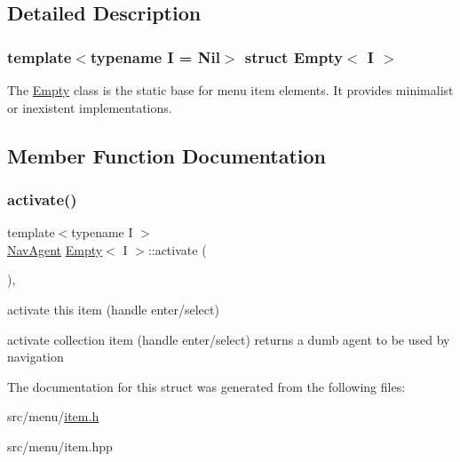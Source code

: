 \subsection{Detailed Description}
\subsubsection*{template$<$typename I = Nil$>$\newline
struct Empty$<$ I $>$}

The \hyperlink{structEmpty}{Empty} class is the static base for menu item elements. It provides minimalist or inexistent implementations. 

\subsection{Member Function Documentation}
\mbox{\label{structEmpty_ade3cccf531dad6fe907c3a9764204e1c}} 
\subsubsection{\texorpdfstring{activate()}{activate()}}
{\footnotesize\ttfamily template$<$typename I $>$ \\
\hyperlink{structNavAgent}{Nav\+Agent} \hyperlink{structEmpty}{Empty}$<$ I $>$\+::activate (\begin{DoxyParamCaption}{ }\end{DoxyParamCaption})\hspace{0.3cm}{\ttfamily [inline]}, {\ttfamily [static]}}



activate this item (handle enter/select) 

activate collection item (handle enter/select) returns a dumb agent to be used by navigation 

The documentation for this struct was generated from the following files\+:\begin{DoxyCompactItemize}
\item 
src/menu/\hyperlink{item_8h}{item.\+h}\item 
src/menu/item.\+hpp\end{DoxyCompactItemize}
